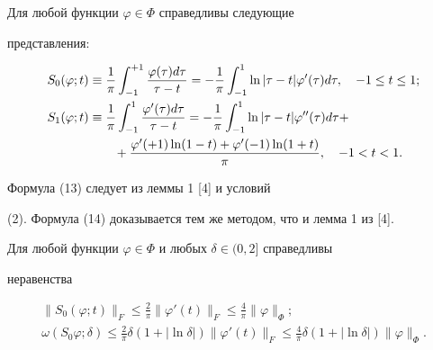 \begin{lem} 


Для любой функции $\varphi\in\Phi$ справедливы следующие 


представления\/${:}$ 


\begin{align} 


S_0(\varphi;t)&\equiv\frac{1}{\pi}\int^{+1}_{-1} 


\frac{\varphi(\tau)d\tau}{\tau-t}=-\frac{1}{\pi}\int^1_{-1} 


\ln|\tau-t|\varphi'(\tau)d\tau,\quad -1\le t\le1; \\ 


% 


S_1(\varphi;t)&\equiv\frac{1}{\pi}\int^1_{-1} 


\frac{\varphi'(\tau)d\tau}{\tau-t}=-\frac{1}{\pi}\int^1_{-1} 


\ln|\tau-t|\varphi''(\tau)d\tau+ \notag \\ 


&\qquad +\frac{\varphi'(+1)\ln(1-t)+\varphi'(-1)\ln(1+t)} 


{\pi},\quad -1<t<1. 


\end{align} 


\end{lem} 


 


\begin{pf} 


Формула (13) следует из леммы 1 [4] и условий 


(2). Формула (14) доказывается тем же методом, что и лемма 1 из [4]. 


\end{pf} 


 


\begin{lem} 


Для любой функции $\varphi\in\Phi$ и любых $\delta\in(0,2]$ справедливы 


неравенства 


\begin{gather} 


\|S_0(\varphi;t)\|_F\le\frac{2}{\pi}\|\varphi'(t)\|_F\le 


\frac{4}{\pi}\|\varphi\|_\Phi;\\ 


% 


\omega(S_0\varphi;\delta)\le\frac{2}{\pi}\delta 


(1+|\ln\delta|)\|\varphi'(t)\|_F\le\frac{4}{\pi}\delta 


(1+|\ln\delta|)\|\varphi\|_\Phi. 


\end{gather} 


\end{lem} 


